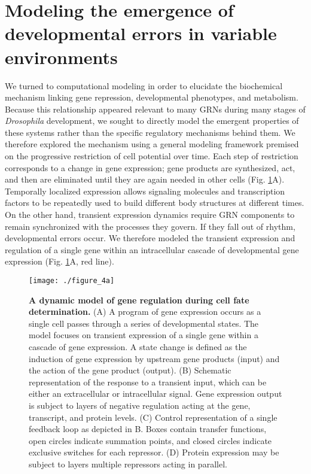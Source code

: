 \section{Modeling the emergence of developmental errors in variable environments}

We turned to computational modeling in order to elucidate the biochemical mechanism linking gene repression, developmental phenotypes, and metabolism. Because this relationship appeared relevant to many GRNs during many stages of \textit{Drosophila} development, we sought to directly model the emergent properties of these systems rather than the specific regulatory mechanisms behind them. We therefore explored the mechanism using a general modeling framework premised on the progressive restriction of cell potential over time. Each step of restriction corresponds to a change in gene expression; gene products are synthesized, act, and then are eliminated until they are again needed in other cells (Fig. \ref{fig:metabolism:fig4a}A). Temporally localized expression allows signaling molecules and transcription factors to be repeatedly used to build different body structures at different times. On the other hand, transient expression dynamics require GRN components to remain synchronized with the processes they govern. If they fall out of rhythm, developmental errors occur. We therefore modeled the transient expression and regulation of a single gene within an intracellular cascade of developmental gene expression (Fig. \ref{fig:metabolism:fig4a}A, red line).

\begin{figure}[h!]
\centering
\texttt{[image: ./figure\_4a]}
\caption[A dynamic model of gene regulation during cell fate determination.]{\textbf{A dynamic model of gene regulation during cell fate determination.} (A) A program of gene expression occurs as a single cell passes through a series of developmental states. The model focuses on transient expression of a single gene within a cascade of gene expression. A state change is defined as the induction of gene expression by upstream gene products (input) and the action of the gene product (output). (B) Schematic representation of the response to a transient input, which can be either an extracellular or intracellular signal. Gene expression output is subject to layers of negative regulation acting at the gene, transcript, and protein levels. (C) Control representation of a single feedback loop as depicted in B. Boxes contain transfer functions, open circles indicate summation points, and closed circles indicate exclusive switches for each repressor. (D) Protein expression may be subject to layers multiple repressors acting in parallel.}
\label{fig:metabolism:fig4a}
\end{figure}

